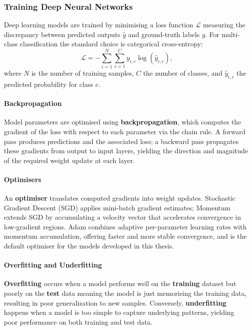\subsubsection{Training Deep Neural Networks}

Deep learning models are trained by minimising a loss function $\mathcal{L}$
measuring the discrepancy between predicted outputs $\hat{y}$ and ground-truth
labels $y$.
For multi-class classification the standard choice is categorical cross-entropy:
\[
\mathcal{L} = -\sum_{i=1}^{N} \sum_{c=1}^{C} y_{i,c} \log(\hat{y}_{i,c}),
\]
where $N$ is the number of training samples, $C$ the number of classes, and
$\hat{y}_{i,c}$ the predicted probability for class $c$.

\paragraph{Backpropagation}
Model parameters are optimised using \textbf{backpropagation}, which computes the
gradient of the loss with respect to each parameter via the chain rule.
A forward pass produces predictions and the associated loss; a backward pass
propagates these gradients from output to input layers, yielding the direction and
magnitude of the required weight update at each layer.

\paragraph{Optimisers}
An \textbf{optimiser} translates computed gradients into weight updates.
Stochastic Gradient Descent (SGD) applies mini-batch gradient estimates; Momentum
extends SGD by accumulating a velocity vector that accelerates convergence in
low-gradient regions.
Adam \cite{kingma2015adam} combines adaptive per-parameter learning rates with
momentum accumulation, offering faster and more stable convergence, and is the
default optimiser for the models developed in this thesis.

\paragraph{Overfitting and Underfitting}
\textbf{Overfitting} occurs when a model performs well on the \textbf{training} dataset
but poorly on the \textbf{test} data meaning the model is just memorising the training
data, resulting in poor generalization to new samples. Conversely,
\textbf{underfitting} happens when a model is too simple to capture
underlying patterns, yielding poor performance on both training and
test data.

